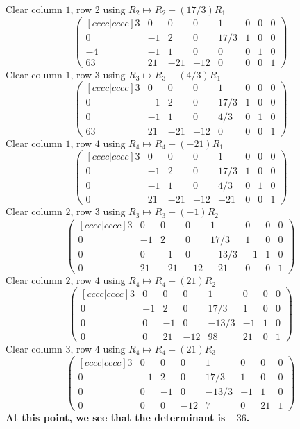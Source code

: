 \documentclass{article}
\begin{document}
Clear column \(1\), row \(2\) using \(R_2\mapsto
R_2+(17/3)R_1\)\[\begin{pmatrix}[ c c c c | c c c c ] 3 & 0 & 0 & 0 &
1 & 0 & 0 & 0 \\ 0 & -1 & 2 & 0 & 17/3 & 1 & 0 & 0 \\ -4 & -1 & 1 & 0
& 0 & 0 & 1 & 0 \\ 63 & 21 & -21 & -12 & 0 & 0 & 0 & 1
\end{pmatrix}\]Clear column \(1\), row \(3\) using \(R_3\mapsto
R_3+(4/3)R_1\)\[\begin{pmatrix}[ c c c c | c c c c ] 3 & 0 & 0 & 0 & 1
& 0 & 0 & 0 \\ 0 & -1 & 2 & 0 & 17/3 & 1 & 0 & 0 \\ 0 & -1 & 1 & 0 &
4/3 & 0 & 1 & 0 \\ 63 & 21 & -21 & -12 & 0 & 0 & 0 & 1
\end{pmatrix}\]Clear column \(1\), row \(4\) using \(R_4\mapsto
R_4+(-21)R_1\)\[\begin{pmatrix}[ c c c c | c c c c ] 3 & 0 & 0 & 0 & 1
& 0 & 0 & 0 \\ 0 & -1 & 2 & 0 & 17/3 & 1 & 0 & 0 \\ 0 & -1 & 1 & 0 &
4/3 & 0 & 1 & 0 \\ 0 & 21 & -21 & -12 & -21 & 0 & 0 & 1
\end{pmatrix}\]Clear column \(2\), row \(3\) using \(R_3\mapsto
R_3+(-1)R_2\)\[\begin{pmatrix}[ c c c c | c c c c ] 3 & 0 & 0 & 0 & 1
& 0 & 0 & 0 \\ 0 & -1 & 2 & 0 & 17/3 & 1 & 0 & 0 \\ 0 & 0 & -1 & 0 &
-13/3 & -1 & 1 & 0 \\ 0 & 21 & -21 & -12 & -21 & 0 & 0 & 1
\end{pmatrix}\]Clear column \(2\), row \(4\) using \(R_4\mapsto
R_4+(21)R_2\)\[\begin{pmatrix}[ c c c c | c c c c ] 3 & 0 & 0 & 0 & 1
& 0 & 0 & 0 \\ 0 & -1 & 2 & 0 & 17/3 & 1 & 0 & 0 \\ 0 & 0 & -1 & 0 &
-13/3 & -1 & 1 & 0 \\ 0 & 0 & 21 & -12 & 98 & 21 & 0 & 1
\end{pmatrix}\]Clear column \(3\), row \(4\) using \(R_4\mapsto
R_4+(21)R_3\)\[\begin{pmatrix}[ c c c c | c c c c ] 3 & 0 & 0 & 0 & 1
& 0 & 0 & 0 \\ 0 & -1 & 2 & 0 & 17/3 & 1 & 0 & 0 \\ 0 & 0 & -1 & 0 &
-13/3 & -1 & 1 & 0 \\ 0 & 0 & 0 & -12 & 7 & 0 & 21 & 1 \end{pmatrix}\]
{\bf At this point, we see that the determinant is \(-36\).}
\end{document}

